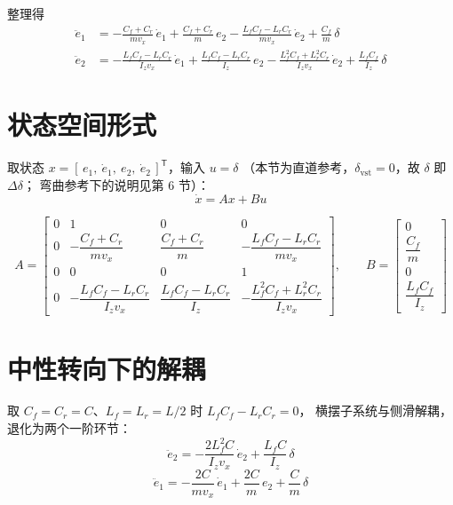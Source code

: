 \documentclass[11pt,a4paper]{article}
\begin{document}
整理得
\begin{align}
\ddot e_1 &= -\frac{C_f + C_r}{m v_x}\,\dot e_1
            + \frac{C_f + C_r}{m}\,e_2
            - \frac{L_f C_f - L_r C_r}{m v_x}\,\dot e_2
            + \frac{C_f}{m}\,\delta \\[4pt]
\ddot e_2 &= -\frac{L_f C_f - L_r C_r}{I_z v_x}\,\dot e_1
            + \frac{L_f C_f - L_r C_r}{I_z}\,e_2
            - \frac{L_f^2 C_f + L_r^2 C_r}{I_z v_x}\,\dot e_2
            + \frac{L_f C_f}{I_z}\,\delta
\end{align}

\section{状态空间形式}

取状态 $x = [\,e_1,\ \dot e_1,\ e_2,\ \dot e_2\,]^{\mathsf T}$，输入 $u = \delta$
（本节为直道参考，$\delta_{\text{vst}} = 0$，故 $\delta$ 即 $\Delta\delta$；
弯曲参考下的说明见第 6 节）：
\begin{equation}
\dot x = A x + B u
\end{equation}

\begin{equation}
A = \begin{bmatrix}
0 & 1 & 0 & 0 \\[4pt]
0 & -\dfrac{C_f + C_r}{m v_x} & \dfrac{C_f + C_r}{m} & -\dfrac{L_f C_f - L_r C_r}{m v_x} \\[10pt]
0 & 0 & 0 & 1 \\[4pt]
0 & -\dfrac{L_f C_f - L_r C_r}{I_z v_x} & \dfrac{L_f C_f - L_r C_r}{I_z} & -\dfrac{L_f^2 C_f + L_r^2 C_r}{I_z v_x}
\end{bmatrix},
\qquad
B = \begin{bmatrix} 0 \\[4pt] \dfrac{C_f}{m} \\[10pt] 0 \\[4pt] \dfrac{L_f C_f}{I_z} \end{bmatrix}
\end{equation}

\section{中性转向下的解耦}

取 $C_f = C_r = C$、$L_f = L_r = L/2$ 时 $L_f C_f - L_r C_r = 0$，
横摆子系统与侧滑解耦，退化为两个一阶环节：
\begin{equation}
\ddot e_2 = -\frac{2 L_f^2 C}{I_z v_x}\,\dot e_2 + \frac{L_f C}{I_z}\,\delta
\end{equation}
\begin{equation}
\ddot e_1 = -\frac{2 C}{m v_x}\,\dot e_1 + \frac{2 C}{m}\,e_2 + \frac{C}{m}\,\delta
\end{equation}
\end{document}
